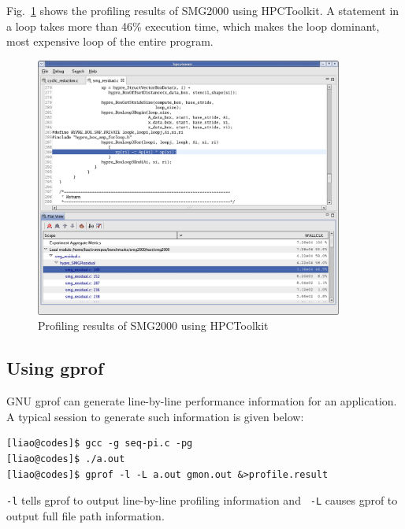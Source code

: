 Fig.~\ref{fig:hpctoolkitSmg2000} shows the profiling results of SMG2000
using HPCToolkit. 
A statement in a loop takes more than 46\% execution time, which makes the
loop dominant, most expensive loop of the entire program.
\begin{figure}[htbp]  
	\centering
		\includegraphics[width=0.9\textwidth]{hpctoolkit-smg2000.png}
	\caption{Profiling results of SMG2000 using HPCToolkit}
	\label{fig:hpctoolkitSmg2000}
\end{figure}

\subsection{Using gprof}
GNU gprof can generate line-by-line performance information for an
application. A typical session to generate such information is given below:
\begin{verbatim}
[liao@codes]$ gcc -g seq-pi.c -pg
[liao@codes]$ ./a.out
[liao@codes]$ gprof -l -L a.out gmon.out &>profile.result
\end{verbatim}

{\tt -l} tells gprof to output line-by-line profiling information and {\tt
-L} causes gprof to output full file path information. 

